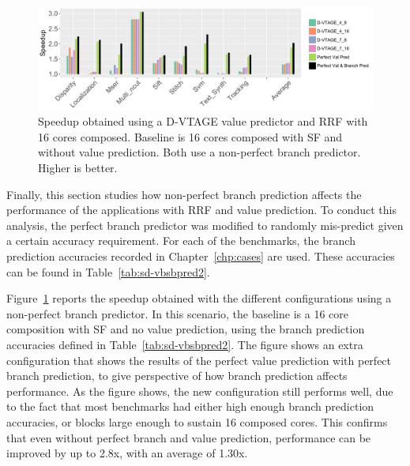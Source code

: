 \begin{figure}[t]
    \centering
    \includegraphics[width=1\textwidth]{chapter3/graphics/with_bpred.pdf}

    \caption{Speedup obtained using a D-VTAGE value predictor and RRF with 16 cores composed. Baseline is 16 cores composed with SF and without value prediction. Both use a non-perfect branch predictor. Higher is better.}
	\vspace{1em}
    \label{fig:bpred}
\end{figure}
Finally, this section studies how non-perfect branch prediction affects the performance of the applications with RRF and value prediction.
To conduct this analysis, the perfect branch predictor was modified to randomly mis-predict given a certain accuracy requirement.
For each of the benchmarks, the branch prediction accuracies recorded in Chapter~\ref{chp:cases} are used.
These accuracies can be found in Table~\ref{tab:sd-vbsbpred2}.

Figure~\ref{fig:bpred} reports the speedup obtained with the different configurations using a non-perfect branch predictor.
In this scenario, the baseline is a 16 core composition with SF and no value prediction, using the branch prediction accuracies defined in Table~\ref{tab:sd-vbsbpred2}.
The figure shows an extra configuration that shows the results of the perfect value prediction with perfect branch prediction, to give perspective of how branch prediction affects performance.
As the figure shows, the new configuration still performs well, due to the fact that most benchmarks had either high enough branch prediction accuracies, or blocks large enough to sustain 16 composed cores.
This confirms that even without perfect branch and value prediction, performance can be improved by up to 2.8x, with an average of 1.30x.





